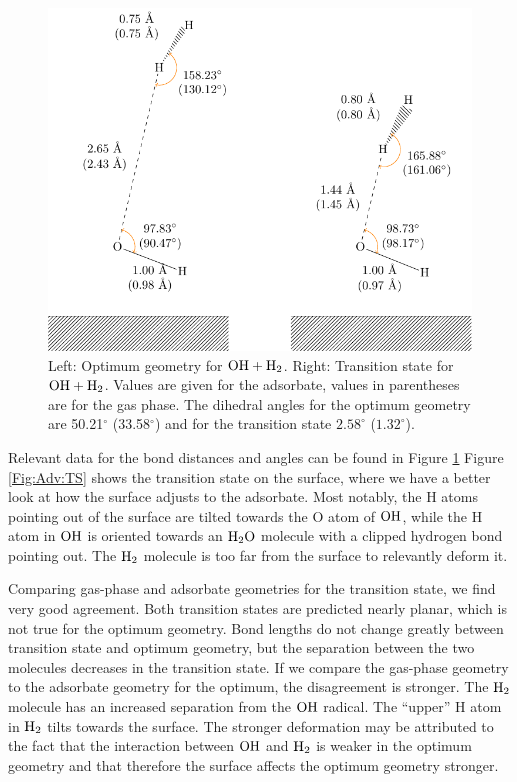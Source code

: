 \documentclass[8.5pt,twoside,twocolumn]{article}
\theoremstyle{standard}
\begin{document}
\begin{figure}[t!]
\includegraphics[width=.49\textwidth]{TikzPics/TikzCreation/HO.H2/HOH2.pdf}
\caption{Left: Optimum geometry for $\mbox{\ensuremath{\text O \text H+\text H_2}}$. Right: Transition state for $\mbox{\ensuremath{\text O \text H+\text H_2}}$.
Values are given for the adsorbate, values in parentheses are for the gas phase.
The
dihedral angles for the optimum geometry are 50.21$^{\circ}$ (33.58$^{\circ}$)
and for the transition state $2.58^{\circ}$ ($1.32^{\circ}$).}

\label{Fig:Adv:TSLengths}
\end{figure}


Relevant data for the bond distances and angles can be found in Figure
\ref{Fig:Adv:TSLengths} %
Figure \ref{Fig:Adv:TS} shows the transition state
on the surface, where we have a better look at how the surface adjusts to
the adsorbate. Most notably, the H atoms pointing out of the surface are
tilted towards the O atom of $\text O \text H$, while the H atom in $\text O \text H$ is oriented
towards an $\text H _2 \text O$ molecule with a clipped hydrogen bond pointing out. The
$\text H_2$ molecule is too far from the surface to relevantly deform it.

Comparing gas-phase and adsorbate geometries for the transition state, we find
very good agreement. Both transition states are predicted nearly planar,
which is not true for the optimum geometry. Bond lengths do not change greatly
between transition state and optimum geometry, but the separation between the
two molecules decreases in the transition state. If we compare the gas-phase
geometry to the adsorbate geometry for the optimum, the disagreement is
stronger. The $\text H_2$ molecule has an increased separation from the $\text O \text H$
radical. The ``upper'' H atom in $\text H_2$ tilts towards the surface. The stronger
deformation may be attributed to the fact that the interaction between $\text O \text H$ and
$\text H_2$ is weaker in the optimum geometry and that therefore the surface affects
the optimum geometry stronger. 
\end{document}
